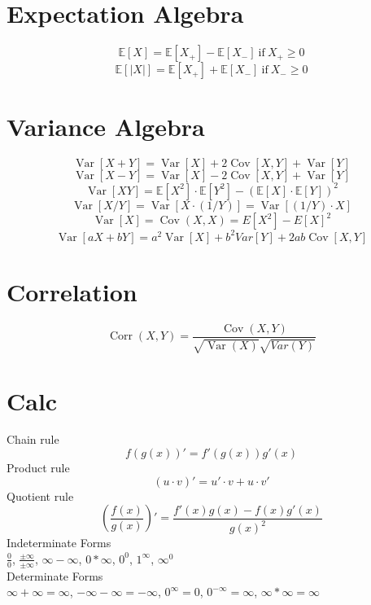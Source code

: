 \documentclass[twocolumn]{amsart}
\newcommand{\E}{\mathbb{E}}
\newcommand{\Cov}{\operatorname{Cov}}
\newcommand{\Corr}{\operatorname{Corr}}
\newcommand{\Var}{\operatorname{Var}}
\begin{document}
\section*{Expectation Algebra}
\begin{equation*}
  \E[X]=\E[X_{+}] - \E[X_{-}]~\text{if}~X_{+} \geq 0
\end{equation*}
\begin{equation*}
  \E[|X|] = \E[X_{+}] + \E[X_{-}]~\text{if}~X_{-} \geq 0
\end{equation*}

\section*{Variance Algebra}
\begin{equation*}
  \Var[X + Y] = \Var[X] + 2\Cov[X, Y] + \Var[Y]
\end{equation*}
\begin{equation*}
  \Var[X - Y] = \Var[X] - 2\Cov[X, Y] + \Var[Y]
\end{equation*}
\begin{equation*}
  \Var[XY] = \E[X^2] \cdot \E[Y^2] - {(\E[X] \cdot \E[Y])}^2
\end{equation*}
\begin{equation*}
  \Var[X/Y] = \Var[X \cdot (1/Y)] = \Var[(1/Y) \cdot X]
\end{equation*}
\begin{equation*}
  \Var[X] = \Cov(X, X) = E[X^2] - {E[X]}^2
\end{equation*}
\begin{equation*}
  \Var[aX+bY] = a^2\Var[X] + b^2 Var[Y] + 2ab\Cov[X,Y]
\end{equation*}

\section*{Correlation}
\begin{equation*}
  \Corr(X, Y) = \frac{\Cov(X, Y)}{\sqrt{\Var(X)}\sqrt{Var(Y)}}
\end{equation*}


\section*{Calc}
Chain rule
\begin{equation*}
  f(g(x))' = f'(g(x))g'(x)
\end{equation*}
Product rule
\begin{equation*}
  (u \cdot v)' = u' \cdot v + u \cdot v'
\end{equation*}
Quotient rule
\begin{equation*}
  \left(\frac{f(x)}{g(x)}\right)' = \frac{f'(x)g(x) - f(x)g'(x)}{g(x)^2}
\end{equation*}
Indeterminate Forms \\
$\frac{0}{0}$, $\frac{\pm\infty}{\pm\infty}$, $\infty-\infty$, $0*\infty$,
$0^{0}$, $1^{\infty}$, $\infty^{0}$ \\
Determinate Forms \\
$\infty+\infty=\infty$, $-\infty-\infty=-\infty$, $0^{\infty}=0$,
$0^{-\infty}=\infty$, $\infty*\infty=\infty$
\end{document}
